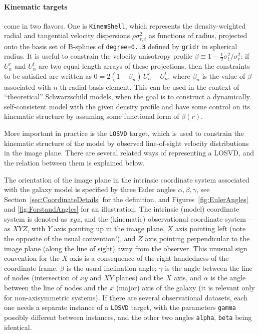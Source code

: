 \documentclass[12pt]{article}
\newcommand{\ppp}[1]{\textcolor{darkolive} {\texttt{#1}}}
\let\oldparagraph\paragraph
\renewcommand{\paragraph}[1]{\vspace{-2mm}\oldparagraph{#1}}
\begin{document}
\paragraph{Kinematic targets} come in two flavors. One is \ppp{KinemShell}, which represents the density-weighted radial and tangential velocity dispersions $\rho\sigma_{r,t}^2$ as functions of radius, projected onto the basis set of B-splines of \ppp{degree=0..3} defined by \ppp{gridr} in spherical radius. 
It is useful to constrain the velocity anisotropy profile $\beta\equiv 1 - \frac12 \sigma_t^2/\sigma_r^2$: if $U_n^r$ and $U_n^t$ are two equal-length arrays of these projections, then the constraints to be satisfied are written as $0 = 2(1-\beta_n)\,U_n^r - U_n^t$, where $\beta_n$ is the value of $\beta$ associated with $n$-th radial basis element. This can be used in the context of ``theoretical'' Schwarzschild models, when the goal is to construct a dynamically self-consistent model with the given density profile and have some control on its kinematic structure by assuming some functional form of $\beta(r)$.

More important in practice is the \ppp{LOSVD} target, which is used to constrain the kinematic structure of the model by observed line-of-sight velocity distributions in the image plane. There are several related ways of representing a LOSVD, and the relation between them is explained below.

The orientation of the image plane in the intrinsic coordinate system associated with the galaxy model is specified by three Euler angles $\alpha,\beta,\gamma$, see Section~\ref{sec:CoordinateDetails} for the definition, and Figures~\ref{fig:EulerAngles} and \ref{fig:ForstandAngles} for an illustration. The intrinsic (model) coordinate system is denoted as $xyz$, and the (kinematic) observational coordinate system -- as $XYZ$, with $Y$ axis pointing up in the image plane, $X$ axis pointing left (note the opposite of the usual convention!), and $Z$ axis pointing perpendicular to the image plane (along the line of sight) away from the observer. This unusual sign convention for the $X$ axis is a consequence of the right-handedness of the coordinate frame. $\beta$ is the usual inclination angle; $\gamma$ is the angle between the line of nodes (intersection of $xy$ and $XY$ planes) and the $X$ axis, and $\alpha$ is the angle between the line of nodes and the $x$ (major) axis of the galaxy (it is relevant only for non-axisymmetric systems). If there are several observational datasets, each one needs a separate instance of a \ppp{LOSVD} target, with the parameters \ppp{gamma} possibly different between instances, and the other two angles \ppp{alpha}, \ppp{beta} being identical.
\end{document}
